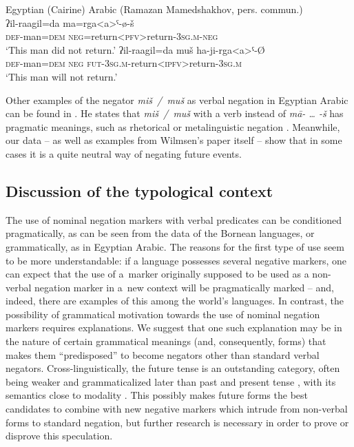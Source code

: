 \documentclass[output=paper,draft,draftmode,colorlinks,citecolor=brown]{langscibook}
\begin{document}
\ea Egyptian (Cairine) Arabic (Ramazan Mamedshakhov, pers. commun.) \label{ex:BK68}\\
  \ea
	\gll ʔil-raagil=da	ma=rga<a>ˤ-ø-š\\
	\textsc{def}-man=\textsc{dem}	\textsc{neg}=return<\textsc{pfv}>return-\textsc{3sg.m-neg}\\
	\glt `This man did not return.'
  \ex
	\gll ʔil-raagil=da	muš	ha-ji-rga<a>ˤ-Ø\\
	\textsc{def}-man=\textsc{dem}	\textsc{neg}	\textsc{fut-3sg.m}-return<\textsc{ipfv}>return-\textsc{3sg.m}\\
	\glt `This man will not return.'
\z \z

Other examples of the negator \textit{miš / muš} as verbal negation in Egyptian Arabic can be found in \citet[93--94]{wilmsen-a}. He states that \textit{miš / muš} with a verb instead of \textit{mā- … -š} has pragmatic meanings, such as rhetorical or metalinguistic negation \citet[94]{wilmsen-a}. Meanwhile, our data – as well as examples from Wilmsen’s paper itself – show that in some cases it is a quite neutral way of negating future events.

\subsection{Discussion of the typological context}\label{sec:BK4.4}
\largerpage
The use of nominal negation markers with verbal predicates can be conditioned pragmatically, as can be seen from the data of the Bornean languages, or grammatically, as in Egyptian Arabic. The reasons for the first type of use seem to be more understandable: if a language possesses several negative markers, one can expect that the use of a marker originally supposed to be used as a non-verbal negation marker in a new context will be pragmatically marked – and, indeed, there are examples of this among the world’s languages. In contrast, the possibility of grammatical motivation towards the use of nominal negation markers requires explanations. We suggest that one such explanation may be in the nature of certain grammatical meanings (and, consequently, forms) that makes them “predisposed” to become negators other than standard verbal negators. Cross-linguistically, the future tense is an outstanding category, often being weaker and grammaticalized later than past and present tense \citep[771]{lindstedt2001a}, with its semantics close to modality \citep[280]{BybeePerkins1994}. This possibly makes future forms the best candidates to combine with new negative markers which intrude from non-verbal forms to standard negation, but further research is necessary in order to prove or disprove this speculation.
\end{document}
